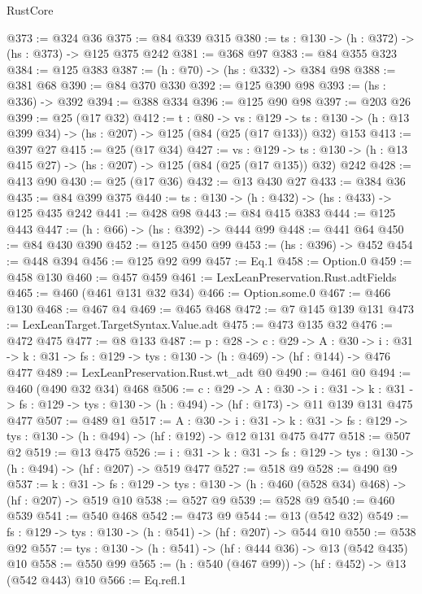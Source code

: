 \begin{lexlean}{RustCore}
\begin{coremodule}
@373 := @324 @36
@375 := @84 @339 @315
@380 := {ts : @130} -> (h : @372) -> (hs : @373) -> @125 @375 @242
@381 := @368 @97
@383 := @84 @355 @323
@384 := @125 @383
@387 := (h : @70) -> (hs : @332) -> @384 @98
@388 := @381 @68
@390 := @84 @370 @330
@392 := @125 @390 @98
@393 := (hs : @336) -> @392
@394 := @388 @334
@396 := @125 @90 @98
@397 := @203 @26
@399 := @25 (@17 @32)
@412 := {t : @80} ->
  {vs : @129} ->
  {ts : @130} -> (h : @13 @399 @34) -> (hs : @207) -> @125 (@84 (@25 (@17 @133)) @32) @153
@413 := @397 @27
@415 := @25 (@17 @34)
@427 := {vs : @129} ->
  {ts : @130} -> (h : @13 @415 @27) -> (hs : @207) -> @125 (@84 (@25 (@17 @135)) @32) @242
@428 := @413 @90
@430 := @25 (@17 @36)
@432 := @13 @430 @27
@433 := @384 @36
@435 := @84 @399 @375
@440 := {ts : @130} -> (h : @432) -> (hs : @433) -> @125 @435 @242
@441 := @428 @98
@443 := @84 @415 @383
@444 := @125 @443
@447 := (h : @66) -> (hs : @392) -> @444 @99
@448 := @441 @64
@450 := @84 @430 @390
@452 := @125 @450 @99
@453 := (hs : @396) -> @452
@454 := @448 @394
@456 := @125 @92 @99
@457 := Eq.{1}
@458 := Option.{0}
@459 := @458 @130
@460 := @457 @459
@461 := LexLeanPreservation.Rust.adtFields
@465 := @460 (@461 @131 @32 @34)
@466 := Option.some.{0}
@467 := @466 @130
@468 := @467 @4
@469 := @465 @468
@472 := @7 @145 @139 @131
@473 := LexLeanTarget.TargetSyntax.Value.adt
@475 := @473 @135 @32
@476 := @472 @475
@477 := @8 @133
@487 := {p : @28} ->
  {c : @29} ->
  {A : @30} ->
  {i : @31} -> {k : @31} -> {fs : @129} -> {tys : @130} -> (h : @469) -> (hf : @144) -> @476 @477
@489 := LexLeanPreservation.Rust.wt_adt @0
@490 := @461 @0
@494 := @460 (@490 @32 @34) @468
@506 := {c : @29} ->
  {A : @30} ->
  {i : @31} ->
  {k : @31} -> {fs : @129} -> {tys : @130} -> (h : @494) -> (hf : @173) -> @11 @139 @131 @475 @477
@507 := @489 @1
@517 := {A : @30} ->
  {i : @31} ->
  {k : @31} -> {fs : @129} -> {tys : @130} -> (h : @494) -> (hf : @192) -> @12 @131 @475 @477
@518 := @507 @2
@519 := @13 @475
@526 := {i : @31} ->
  {k : @31} -> {fs : @129} -> {tys : @130} -> (h : @494) -> (hf : @207) -> @519 @477
@527 := @518 @9
@528 := @490 @9
@537 := {k : @31} ->
  {fs : @129} -> {tys : @130} -> (h : @460 (@528 @34) @468) -> (hf : @207) -> @519 @10
@538 := @527 @9
@539 := @528 @9
@540 := @460 @539
@541 := @540 @468
@542 := @473 @9
@544 := @13 (@542 @32)
@549 := {fs : @129} -> {tys : @130} -> (h : @541) -> (hf : @207) -> @544 @10
@550 := @538 @92
@557 := {tys : @130} -> (h : @541) -> (hf : @444 @36) -> @13 (@542 @435) @10
@558 := @550 @99
@565 := (h : @540 (@467 @99)) -> (hf : @452) -> @13 (@542 @443) @10
@566 := Eq.refl.{1}

\end{coremodule}
\end{lexlean}
